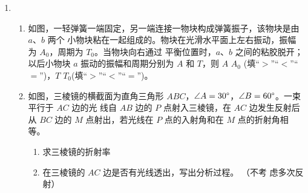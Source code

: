 \begin{enumerate}
\begin{enumerate}
\end{enumerate}


\item 
{}
\begin{enumerate}
	\item
如图，一轻弹簧一端固定，另一端连接一物块构成弹簧振子，该物块是由 $ a $、$ b $ 两个
小物块粘在一起组成的。物块在光滑水平面上左右振动，振幅为 $ A_{0} $，周期为 $ T_{0} $。当物块向右通过
平衡位置时，$ a $、$ b $ 之间的粘胶脱开；以后小物块 $ a $ 振动的振幅和周期分别为 $ A $ 和 $ T $，则 $ A $ \underlinegap $ A_{0} $
(填“$ > $”“$ < $”“$ = $”)，$ T $ \underlinegap $ T_{0} $(填“$ > $”“$ < $”“$ = $”)。
\begin{figure}[h!]
	\centering
	
\end{figure}

 \tk{$ < $ \quad $ < $} 


\item 
如图，三棱镜的横截面为直角三角形 $ ABC $，$ \angle A=30 \degree $，$ \angle B=60 \degree $。一束平行于 $ AC $ 边的光
线自 $ AB $ 边的 $ P $ 点射入三棱镜，在 $ AC $ 边发生反射后从 $ BC $ 边的 $ M $
点射出，若光线在 $ P $ 点的入射角和在 $ M $ 点的折射角相等。
\begin{enumerate}
	\item
求三棱镜的折射率
\item 
在三棱镜的 $ AC $ 边是否有光线透出，写出分析过程。
（不考
虑多次反射）

	
\end{enumerate}
\begin{figure}[h!]
	\flushright
	
\end{figure}





\end{enumerate}
\end{enumerate}
